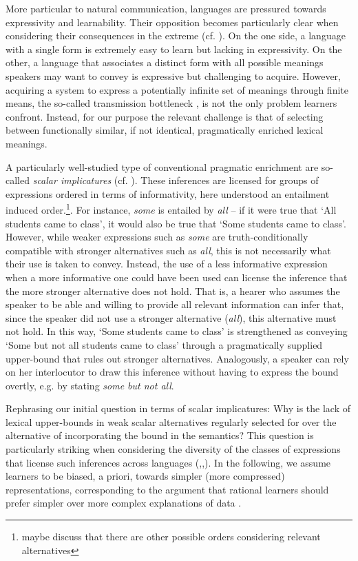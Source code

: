 \documentclass[a4paper]{article}
\newcommand{\hl}[1]{\textcolor[rgb]{.8,.33,.0}{#1}}%
\begin{document}
More particular to natural communication, languages are pressured towards expressivity and learnability. Their opposition becomes particularly clear when considering their consequences in the extreme (cf. \citealt{kemp+regier:2012,kirby+etal:2015}). On the one side, a language with a single form is extremely easy to learn but lacking in expressivity. On the other, a language that associates a distinct form with all possible meanings speakers may want to convey is expressive but challenging to acquire. However, acquiring a system to express a potentially infinite set of meanings through finite means, the so-called transmission bottleneck \citep{kirby:2002}, is not the only problem learners confront. Instead, for our purpose the relevant challenge is that of selecting between functionally similar, if not identical, pragmatically enriched lexical meanings. 

A particularly well-studied type of conventional pragmatic enrichment are so-called {\em scalar implicatures} (cf. \citealt{horn:1972,gazdar:1979}). These inferences are licensed for groups of expressions ordered in terms of informativity, here understood an entailment induced order.\footnote{\hl{maybe discuss that there are other possible orders considering relevant alternatives}}. For instance, {\em some} is entailed by {\em all} -- if it were true that `All students came to class', it would also be true that `Some students came to class'. However, while weaker expressions such as {\em some} are truth-conditionally compatible with stronger alternatives such as {\em all}, this is not necessarily what their use is taken to convey. Instead, the use of a less informative expression when a more informative one could have been used can license the inference that the more stronger alternative does not hold. That is, a hearer who assumes the speaker to be able and willing to provide all relevant information can infer that, since the speaker did not use a stronger alternative ({\em all}), this alternative must not hold. In this way, `Some students came to class' is strengthened as conveying `Some but not all students came to class' through a pragmatically supplied upper-bound that rules out stronger alternatives. Analogously, a speaker can rely on her interlocutor to draw this inference without having to express the bound overtly, e.g. by stating {\em some but not all}. 

Rephrasing our initial question in terms of scalar implicatures: Why is the lack of lexical upper-bounds in weak scalar alternatives regularly selected for over the alternative of incorporating the bound in the semantics? This question is particularly striking when considering the diversity of the classes of expressions that license such inferences across languages (\citealt{horn:1972},\citealt[252-267]{horn:1984},\citealt{traugott:2004,vdAuwera:2010}). In the following, we assume learners to be biased, a priori, towards simpler (more compressed) representations, corresponding to the argument that rational learners should prefer simpler over more complex explanations of data \citep{feldman:2000, chater+vitanyi:2003, piantadosi+etal:2012a, kirby+etal:2015,piantadosi+etal:underreview}. 
\end{document}
